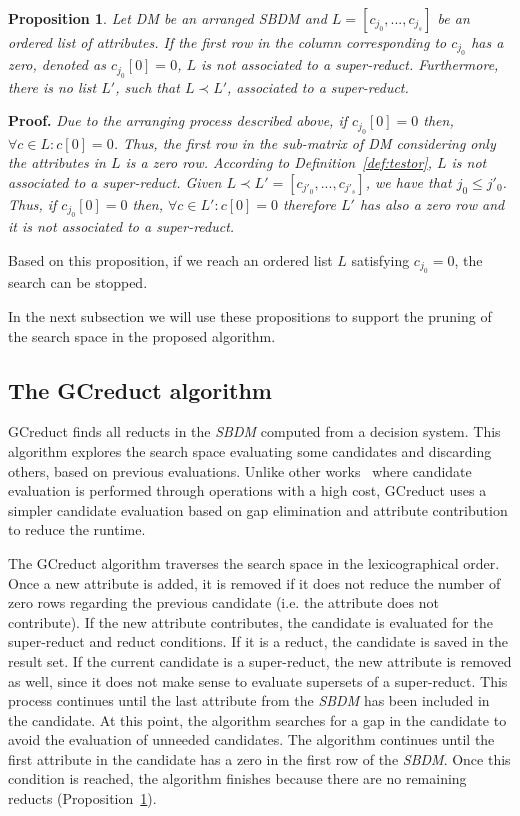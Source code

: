 \documentclass[letterpaper, twoside, openright, 12pt]{book}%
\newtheorem{proposition}{Proposition}
\begin{document}
	\begin{proposition}\label{prop:firstRow}
		Let DM be an arranged SBDM and $L = [c_{j_0},...,c_{j_s}]$ be an ordered list of attributes. If the first row in the column corresponding to $c_{j_0}$ has a zero, denoted as $c_{j_0}[0]=0$, $L$ is not associated to a super-reduct. Furthermore, there is no list $L'$, such that $L\prec L'$, associated to a super-reduct.
	\end{proposition}
	
	\noindent
	\textbf{Proof.} \textit{Due to the arranging process described above, if $c_{j_0}[0]=0$ then, $\forall c \in L: c[0]=0$. Thus, the first row in the sub-matrix of DM considering only the attributes in $L$ is a zero row. According to Definition~\ref{def:testor}, $L$ is not associated to a super-reduct. Given $L \prec L'= [c_{j'_0},...,c_{j'_s}]$, we have that $j_0 \leq j'_0$. Thus, if $c_{j_0}[0]=0$ then, $\forall c \in L': c[0]=0$ therefore $L'$ has also a zero row and it is not associated to a super-reduct.}
	
	Based on this proposition, if we reach an ordered list $L$ satisfying $c_{j_0}=0$, the search can be stopped. 
	
	In the next subsection we will use these propositions to support the pruning of the search space in the proposed algorithm.
%	
\subsection{The GCreduct algorithm}\label{description}
%
	GCreduct finds all reducts in the \textit{SBDM} computed from a decision system. This algorithm explores the search space evaluating some candidates and discarding others, based on previous evaluations. Unlike other works~\citep{WangP07,Lias13} where candidate evaluation is performed through operations with a high cost, GCreduct uses a simpler candidate evaluation based on gap elimination and attribute contribution to reduce the runtime.
	
	The GCreduct algorithm traverses the search space in the lexicographical order. Once a new attribute is added, it is removed if it does not reduce the number of zero rows regarding the previous candidate (i.e. the attribute does not contribute). If the new attribute contributes, the candidate is evaluated for the super-reduct and reduct conditions. If it is a reduct, the candidate is saved in the result set. If the current candidate is a super-reduct, the new attribute is removed as well, since it does not make sense to evaluate supersets of a super-reduct. This process continues until the last attribute from the \textit{SBDM} has been included in the candidate. At this point, the algorithm searches for a gap in the candidate to avoid the evaluation of unneeded candidates. The algorithm continues until the first attribute in the candidate has a zero in the first row of the \textit{SBDM}. Once this condition is reached, the algorithm finishes because there are no remaining reducts (Proposition~\ref{prop:firstRow}).
\end{document}
